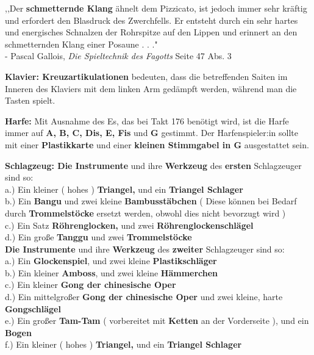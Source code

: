 \documentclass[12pt]{article}
\newcommand*\circled[1]{\tikz[baseline=(char.base)]{
            \node[shape=circle,draw,inner sep=1pt] (char) {#1};}}
\begin{document}
\begingroup
\begin{center}
,,Der \textbf{schmetternde Klang} ähnelt dem Pizzicato, ist jedoch immer sehr kräftig und erfordert den Blasdruck des Zwerchfells. Er entsteht durch ein sehr hartes und energisches Schnalzen der Rohrspitze auf den Lippen und erinnert an den schmetternden Klang einer Posaune . . ." \\

- Pascal Gallois, \textit{Die Spieltechnik des Fagotts} Seite 47 Abs. 3
\end{center}
\endgroup

\begingroup
\textbf{Klavier: \circled{1} Kreuzartikulationen} bedeuten, dass die betreffenden Saiten im Inneren des Klaviers mit dem linken Arm gedämpft werden, während man die Tasten spielt.
\endgroup

\begingroup
\textbf{Harfe: \circled{1}} Mit Ausnahme des Es, das bei Takt 176 benötigt wird, ist die Harfe immer auf \textbf{A, B, C, Dis, E, Fis} und \textbf{G} gestimmt. \textbf{\circled{2}} Der Harfenspieler:in sollte mit einer \textbf{Plastikkarte} und einer \textbf{kleinen Stimmgabel in G} ausgestattet sein.
\endgroup

\begingroup
\textbf{Schlagzeug: \circled{1} Die Instrumente} und ihre \textbf{Werkzeug} des \textbf{ersten} Schlagzeuger sind so: \\
a.) Ein kleiner ( hohes ) \textbf{Triangel,} und ein \textbf{Triangel Schlager} \\
b.) Ein \textbf{Bangu \setmainfont{Source Han Serif SC Bold}\selectfont{ ( 板鼓 ), } }und zwei kleine \textbf{Bambusstäbchen} ( Diese können bei Bedarf durch \textbf{Trommelstöcke} ersetzt werden, obwohl dies nicht bevorzugt wird ) \\
c.) Ein Satz \textbf{Röhrenglocken,} und zwei \textbf{Röhrenglockenschlägel} \\
d.) Ein große \textbf{Tanggu \setmainfont{Source Han Serif SC Bold}\selectfont{ ( 堂鼓 ), } }und zwei \textbf{Trommelstöcke}\\
\textbf{\circled{3} Die Instrumente} und ihre \textbf{Werkzeug} des \textbf{zweiter} Schlagzeuger sind so: \\
a.) Ein \textbf{Glockenspiel}, und zwei kleine \textbf{Plastikschläger} \\
b.) Ein kleiner \textbf{Amboss}, und zwei kleine \textbf{Hämmerchen} \\
c.) Ein kleiner \textbf{Gong der chinesische Oper\setmainfont{Source Han Serif SC Bold}\selectfont{ ( 小鑼 ) } }  \\
d.) Ein mittelgroßer \textbf{Gong der chinesische Oper \setmainfont{Source Han Serif SC Bold}\selectfont{ ( 中型鑼 ), } } und zwei kleine, harte \textbf{Gongschlägel}\\
e.) Ein großer \textbf{Tam-Tam} ( vorbereitet mit \textbf{Ketten} an der Vorderseite ), und ein \textbf{Bogen} \\
f.) Ein kleiner ( hohes ) \textbf{Triangel,} und ein \textbf{Triangel Schlager} \\
\endgroup
\end{document}
